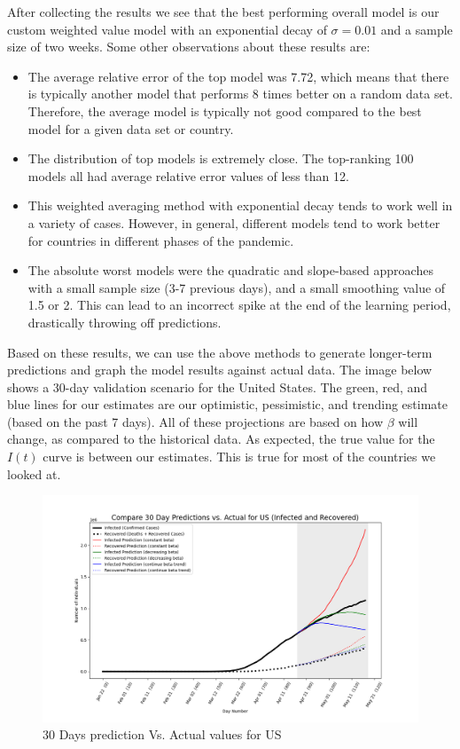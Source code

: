 \documentclass[11pt]{article}
\begin{document}
After collecting the results we see that the best performing overall model is our custom weighted value model with an exponential decay of $\sigma=0.01$ and a sample size of two weeks. Some other observations about these results are:
\begin{itemize}
    \item The average relative error of the top model was 7.72, which means that there is typically another model that performs 8 times better on a random data set. Therefore, the average model is typically not good compared to the best model for a given data set or country.
    \item The distribution of top models is extremely close. The top-ranking 100 models all had average relative error values of less than 12.
    \item This weighted averaging method with exponential decay tends to work well in a variety of cases. However, in general, different models tend to work better for countries in different phases of the pandemic.
    \item The absolute worst models were the quadratic and slope-based approaches with a small sample size (3-7 previous days), and a small smoothing value of 1.5 or 2. This can lead to an incorrect spike at the end of the learning period, drastically throwing off predictions.
\end{itemize}

Based on these results, we can use the above methods to generate longer-term predictions and graph the model results against actual data. The image below shows a 30-day validation scenario for the United States. The green, red, and blue lines for our estimates are our optimistic, pessimistic, and trending estimate (based on the past 7 days). All of these projections are based on how $\beta$ will change, as compared to the historical data. As expected, the true value for the $I(t)$ curve is between our estimates. This is true for most of the countries we looked at.

\begin{figure}[h]
    \includegraphics[width=16cm]{images/30-days-prediction-vs-actual-US.png}
    \centering
    \caption{30 Days prediction Vs. Actual values for US}
    \label{fig:30-days-prediction-vs-actual-value}
\end{figure}
\end{document}
